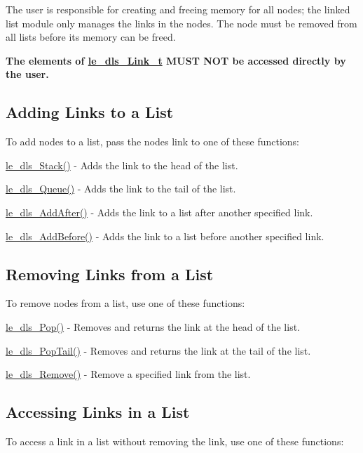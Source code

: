 The user is responsible for creating and freeing memory for all nodes; the linked list module only manages the links in the nodes. The node must be removed from all lists before its memory can be freed.

{\bfseries The elements of {\ttfamily \hyperlink{structle__dls___link__t}{le\+\_\+dls\+\_\+\+Link\+\_\+t}} M\+U\+S\+T N\+O\+T be accessed directly by the user.}\hypertarget{c_doubly_linked_list_dls_add}{}\subsection{Adding Links to a List}\label{c_doubly_linked_list_dls_add}
To add nodes to a list, pass the node\textquotesingle{}s link to one of these functions\+:


\begin{DoxyItemize}
\item {\ttfamily \hyperlink{le__doubly_linked_list_8h_a90f9072a55ef0cb573bbdad91e34d368}{le\+\_\+dls\+\_\+\+Stack()}} -\/ Adds the link to the head of the list.
\item {\ttfamily \hyperlink{le__doubly_linked_list_8h_a264df63b847a9c485df0bf9050ac5deb}{le\+\_\+dls\+\_\+\+Queue()}} -\/ Adds the link to the tail of the list.
\item {\ttfamily \hyperlink{le__doubly_linked_list_8h_ad93394ff686d2fe93f5f4ce73c7034cd}{le\+\_\+dls\+\_\+\+Add\+After()}} -\/ Adds the link to a list after another specified link.
\item {\ttfamily \hyperlink{le__doubly_linked_list_8h_a6b68837b42fc2c68885db0857e7c71bf}{le\+\_\+dls\+\_\+\+Add\+Before()}} -\/ Adds the link to a list before another specified link.
\end{DoxyItemize}\hypertarget{c_doubly_linked_list_dls_remove}{}\subsection{Removing Links from a List}\label{c_doubly_linked_list_dls_remove}
To remove nodes from a list, use one of these functions\+:


\begin{DoxyItemize}
\item {\ttfamily \hyperlink{le__doubly_linked_list_8h_a4bd942822ffc97004f46f9d062f62270}{le\+\_\+dls\+\_\+\+Pop()}} -\/ Removes and returns the link at the head of the list.
\item {\ttfamily \hyperlink{le__doubly_linked_list_8h_a31d98b6cfe8de4e618c07bb06e983e81}{le\+\_\+dls\+\_\+\+Pop\+Tail()}} -\/ Removes and returns the link at the tail of the list.
\item {\ttfamily \hyperlink{le__doubly_linked_list_8h_ac5e1d4687e04c4e44359ce697ea9eeb2}{le\+\_\+dls\+\_\+\+Remove()}} -\/ Remove a specified link from the list.
\end{DoxyItemize}\hypertarget{c_doubly_linked_list_dls_peek}{}\subsection{Accessing Links in a List}\label{c_doubly_linked_list_dls_peek}
To access a link in a list without removing the link, use one of these functions\+:



